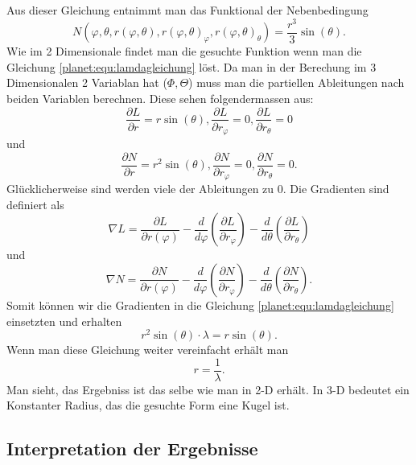 Aus dieser Gleichung entnimmt man das Funktional der Nebenbedingung
\begin{equation*}
	N(\varphi,\theta ,r(\varphi,\theta),r(\varphi,\theta)_\varphi,r(\varphi,\theta)_\theta) = \frac{r^3}{3} \sin (\theta).
\end{equation*}
Wie im 2 Dimensionale findet man die gesuchte Funktion wenn man die Gleichung \ref{planet:equ:lamdagleichung} löst.
Da man in der Berechung im 3 Dimensionalen 2 Variablan hat (\(\Phi,\Theta\)) muss man die partiellen Ableitungen nach beiden Variablen berechnen.
Diese sehen folgendermassen aus:
\begin{equation*}
	\frac{\partial L}{\partial r} = r  \sin (\theta) ,
	\frac{\partial L}{\partial r_\varphi} = 0 ,
	\frac{\partial L}{\partial r_\theta} = 0
\end{equation*}
und
\begin{equation*}
	\frac{\partial N}{\partial r} = r^2\sin (\theta) ,
	\frac{\partial N}{\partial r_\varphi} = 0 ,
	\frac{\partial N}{\partial r_\theta} = 0.
\end{equation*}
Glücklicherweise sind werden viele der Ableitungen zu 0.
Die Gradienten sind definiert als
\begin{equation*}
	\nabla L =  \frac{\partial L}{\partial r(\varphi)} 
	-\frac{d}{d\varphi}\left( \frac{\partial L}{\partial r_\varphi} \right)
	-\frac{d}{d\theta}\left( \frac{\partial L}{\partial r_\theta} \right)
\end{equation*}
und
\begin{equation*}
	\nabla N=  \frac{\partial N}{\partial r(\varphi)} 
	-\frac{d}{d\varphi}\left( \frac{\partial N}{\partial r_\varphi} \right)
	-\frac{d}{d\theta}\left( \frac{\partial N}{\partial r_\theta} \right).
\end{equation*}
Somit können wir die Gradienten in die Gleichung \ref{planet:equ:lamdagleichung} einsetzten und erhalten
\begin{equation*}
	r^2\sin (\theta) \cdot \lambda = r \sin (\theta).
\end{equation*}
Wenn man diese Gleichung weiter vereinfacht erhält man
\begin{equation*}
	r = \frac{1}{\lambda}.
\end{equation*}
Man sieht, das Ergebniss ist das selbe wie man in 2-D erhält.
In 3-D bedeutet ein Konstanter Radius, das die gesuchte Form eine Kugel ist.
\subsection{Interpretation der Ergebnisse}

